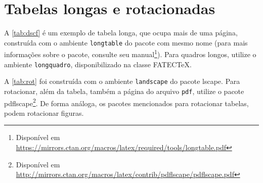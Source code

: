 \chapter{Tabelas longas e rotacionadas}\label{apd:tabs}

A \cref{tab:dscf} é um exemplo de tabela longa, que ocupa mais de uma página, construída com o ambiente \texttt{longtable} do pacote com mesmo nome (para mais informações sobre o pacote, consulte seu manual\footnote{Disponível em \url{https://mirrors.ctan.org/macros/latex/required/tools/longtable.pdf}}). Para quadros longos, utilize o ambiente \texttt{longquadro}, disponibilizado na classe FATEC\TeX. 

A \cref{tab:rot} foi construída com o ambiente \texttt{landscape} do pacote \textsf{lscape}. Para rotacionar, além da tabela, também a página do arquivo \texttt{pdf}, utilize o pacote \textsf{pdflscape}\footnote{Disponível em \url{http://mirrors.ctan.org/macros/latex/contrib/pdflscape/pdflscape.pdf}}. De forma análoga, os pacotes mencionados para rotacionar tabelas, podem rotacionar figuras.

